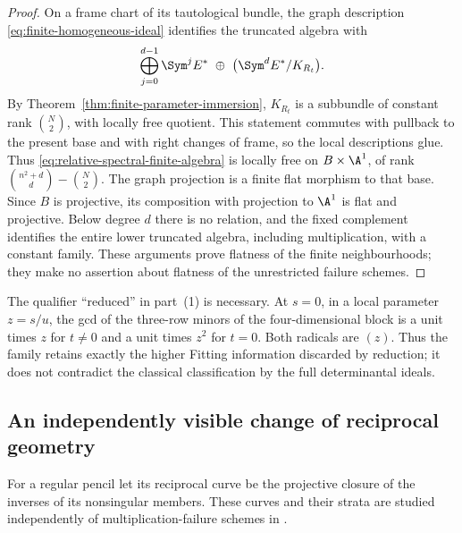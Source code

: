 \begin{proof}
On a frame chart of its tautological bundle, the graph description
\eqref{eq:finite-homogeneous-ideal} identifies the truncated algebra
with
\begin{equation}\label{eq:relative-spectral-finite-algebra}
 \bigoplus_{j=0}^{d-1}\Sym^j E^*
       \ \oplus\ \bigl(\Sym^d E^*/K_{R_t}\bigr).
\end{equation}
By Theorem~\ref{thm:finite-parameter-immersion}, \(K_{R_t}\)
is a subbundle of constant rank \(\binom N2\), with locally
free quotient.  This statement commutes with pullback to the present
base and with right changes of frame, so the local descriptions glue.
Thus \eqref{eq:relative-spectral-finite-algebra} is locally free
on \(B\times\A^1\), of rank
\(\binom{n^2+d}{d}-\binom N2\).  The graph projection is a
finite flat morphism to that base.  Since \(B\) is projective,
its composition with projection to \(\A^1\) is flat and
projective.  Below degree \(d\) there is no relation, and the
fixed complement identifies the entire lower truncated algebra,
including multiplication, with a constant family.  These arguments
prove flatness of the finite neighbourhoods; they make no assertion
about flatness of the unrestricted failure schemes.
\end{proof}

The qualifier ``reduced'' in part~(1) is necessary.  At \(s=0\),
in a local parameter \(z=s/u\), the gcd of the three-row minors of
the four-dimensional block is a unit times \(z\) for \(t\ne0\)
and a unit times \(z^2\) for \(t=0\).  Both radicals are
\((z)\).  Thus the family retains exactly the higher Fitting
information discarded by reduction; it does not contradict the
classical classification by the full determinantal ideals.

\subsection{An independently visible change of reciprocal geometry}

For a regular pencil let its reciprocal curve be the projective closure
of the inverses of its nonsingular members.  These curves and their
strata are studied independently of multiplication-failure schemes in
\cite[\S3]{FevolaMandelshtamSturmfels}.

